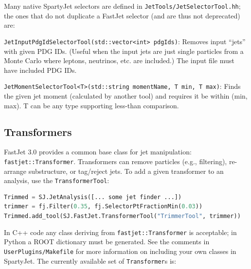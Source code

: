 \documentclass{article}
\newcommand{\prog}[1]{{\sc #1}\xspace}
\newcommand{\code}[1]{{\tt #1}\xspace}
\newcommand{\codes}[1]{{\tt #1}s\xspace}
\newcommand{\SJ}[0]{\prog{SpartyJet}}
\newcommand{\FJ}[0]{\prog{FastJet}}
\begin{document}
Many native \SJ selectors are defined in \verb+JetTools/JetSelectorTool.hh+; the ones that do not duplicate a \FJ selector (and are thus not deprecated) are:

\begin{description}
\item \code{JetInputPdgIdSelectorTool(std::vector<int> pdgIds)}: Removes input ``jets'' with given PDG IDs.  (Useful when the input jets are just single particles from a Monte Carlo where leptons, neutrinos, etc. are included.)  The input file must have included PDG IDs.
\item \code{JetMomentSelectorTool<T>(std::string momentName, T min, T max)}: Finds the given jet moment (calculated by another tool) and requires it be within (min, max).  T can be any type supporting less-than comparison.
\end{description}

\subsection{Transformers}
\FJ 3.0 provides a common base class for jet manipulation: \code{fastjet::Transformer}.  Transformers can remove particles (e.g., filtering), re-arrange substructure, or tag/reject jets.  To add a given transformer to an analysis, use the \code{TransformerTool}:

\begin{lstlisting}[language=Python]
Trimmed = SJ.JetAnalysis([... some jet finder ...])
trimmer = fj.Filter(0.35, fj.SelectorPtFractionMin(0.03))
Trimmed.add_tool(SJ.FastJet.TransformerTool("TrimmerTool", trimmer))
\end{lstlisting}

In C++ code any class deriving from \code{fastjet::Transformer} is acceptable; in Python a \prog{ROOT} dictionary must be generated.  See the comments in \verb+UserPlugins/Makefile+ for more information on including your own classes in \SJ.  The currently available set of \codes{Transformer} is:
\end{document}

